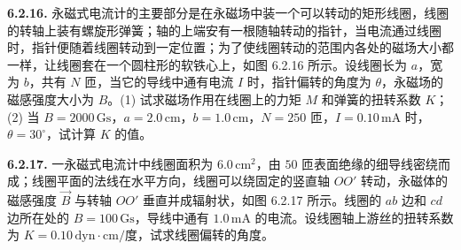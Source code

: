 \begin{center}
\end{center}

\vfill
\newpage

\textbf{6.2.16.} 永磁式电流计的主要部分是在永磁场中装一个可以转动的矩形线圈，线圈的转轴上装有螺旋形弹簧；轴的上端安有一根随轴转动的指针，当电流通过线圈时，指针便随着线圈转动到一定位置；为了使线圈转动的范围内各处的磁场大小都一样，让线圈套在一个圆柱形的软铁心上，如图 6.2.16 所示。设线圈长为 $a$，宽为 $b$，共有 $N$ 匝，当它的导线中通有电流 $I$ 时，指针偏转的角度为 $\theta$，永磁场的磁感强度大小为 $B$。(1) 试求磁场作用在线圈上的力矩 $M$ 和弹簧的扭转系数 $K$；(2) 当 $B = 2000\,\mathrm{Gs}$，$a = 2.0\,\mathrm{cm}$，$b = 1.0\,\mathrm{cm}$，$N = 250$ 匝，$I = 0.10\,\mathrm{mA}$ 时，$\theta = 30^{\circ}$，试计算 $K$ 的值。

\begin{center}
  \begin{minipage}[b]{0.47\linewidth}
    \centering
  \end{minipage}\hfill
  \begin{minipage}[b]{0.47\linewidth}
    \centering
  \end{minipage}
\end{center}

\vfill
\newpage

\textbf{6.2.17.} 一永磁式电流计中线圈面积为 $6.0\,\mathrm{cm}^{2}$，由 $50$ 匝表面绝缘的细导线密绕而成；线圈平面的法线在水平方向，线圈可以绕固定的竖直轴 $OO'$ 转动，永磁体的磁感强度 $\vec{B}$ 与转轴 $OO'$ 垂直并成辐射状，如图 6.2.17 所示。线圈的 $ab$ 边和 $cd$ 边所在处的 $B = 100\,\mathrm{Gs}$，导线中通有 $1.0\,\mathrm{mA}$ 的电流。设线圈轴上游丝的扭转系数为 $K = 0.10\,\mathrm{dyn\cdot cm/}$度，试求线圈偏转的角度。

\begin{center}
  \begin{minipage}[b]{0.47\linewidth}
    \centering
  \end{minipage}\hfill
  \begin{minipage}[b]{0.47\linewidth}
    \centering
  \end{minipage}
\end{center}

